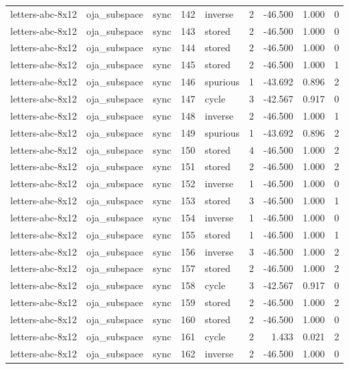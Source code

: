 \begin{tabular}{lllrlrrrr}
letters-abc-8x12 & oja\_subspace & sync & 142 & inverse & 2 & -46.500 & 1.000 & 0 \\
letters-abc-8x12 & oja\_subspace & sync & 143 & stored & 2 & -46.500 & 1.000 & 0 \\
letters-abc-8x12 & oja\_subspace & sync & 144 & stored & 2 & -46.500 & 1.000 & 0 \\
letters-abc-8x12 & oja\_subspace & sync & 145 & stored & 2 & -46.500 & 1.000 & 1 \\
letters-abc-8x12 & oja\_subspace & sync & 146 & spurious & 1 & -43.692 & 0.896 & 2 \\
letters-abc-8x12 & oja\_subspace & sync & 147 & cycle & 3 & -42.567 & 0.917 & 0 \\
letters-abc-8x12 & oja\_subspace & sync & 148 & inverse & 2 & -46.500 & 1.000 & 1 \\
letters-abc-8x12 & oja\_subspace & sync & 149 & spurious & 1 & -43.692 & 0.896 & 2 \\
letters-abc-8x12 & oja\_subspace & sync & 150 & stored & 4 & -46.500 & 1.000 & 2 \\
letters-abc-8x12 & oja\_subspace & sync & 151 & stored & 2 & -46.500 & 1.000 & 2 \\
letters-abc-8x12 & oja\_subspace & sync & 152 & inverse & 1 & -46.500 & 1.000 & 0 \\
letters-abc-8x12 & oja\_subspace & sync & 153 & stored & 3 & -46.500 & 1.000 & 1 \\
letters-abc-8x12 & oja\_subspace & sync & 154 & inverse & 1 & -46.500 & 1.000 & 0 \\
letters-abc-8x12 & oja\_subspace & sync & 155 & stored & 1 & -46.500 & 1.000 & 1 \\
letters-abc-8x12 & oja\_subspace & sync & 156 & inverse & 3 & -46.500 & 1.000 & 2 \\
letters-abc-8x12 & oja\_subspace & sync & 157 & stored & 2 & -46.500 & 1.000 & 2 \\
letters-abc-8x12 & oja\_subspace & sync & 158 & cycle & 3 & -42.567 & 0.917 & 0 \\
letters-abc-8x12 & oja\_subspace & sync & 159 & stored & 2 & -46.500 & 1.000 & 2 \\
letters-abc-8x12 & oja\_subspace & sync & 160 & stored & 2 & -46.500 & 1.000 & 0 \\
letters-abc-8x12 & oja\_subspace & sync & 161 & cycle & 2 & 1.433 & 0.021 & 2 \\
letters-abc-8x12 & oja\_subspace & sync & 162 & inverse & 2 & -46.500 & 1.000 & 0 \\

\end{tabular}

